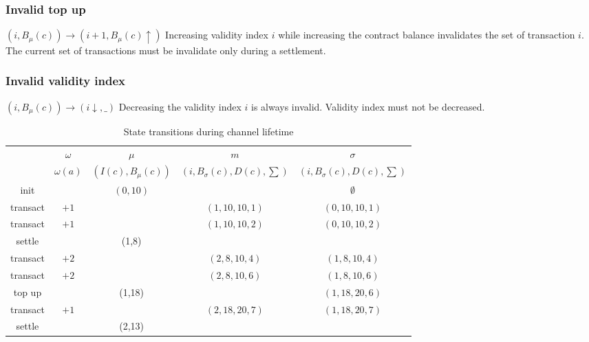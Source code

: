 \documentclass{llncs}
\begin{document}
\subsubsection{Invalid top up} $(i, B_\mu(c)) \rightarrow (i+1, B_\mu(c)\uparrow)$ Increasing validity index $i$ while increasing the contract balance invalidates the set of transaction $i$. The current set of transactions must be invalidate only during a settlement.

\subsubsection{Invalid validity index} $(i, B_\mu(c)) \rightarrow (i\downarrow, \_)$ Decreasing the validity index $i$ is always invalid. Validity index must not be decreased.

\begin{table}[t]
  \begin{tabularx}{\textwidth}{| S | S | C | C | C |}
       & $\omega$ & $\mu$ & $m$ & $\sigma$ \\ 
       & $\omega(a)$ & $(I(c), B_\mu(c))$ & $(i, B_\sigma(c), D(c), \sum)$ & $(i, B_\sigma(c), D(c), \sum)$ \\
  \hhline{-====}
      init & & $(0,10)$ & & $\emptyset$ \\
      transact & $+1$ & & $(1, 10, 10, 1)$& $(0, 10, 10, 1)$ \\
      transact & $+1$ & & $(1, 10, 10, 2)$& $(0, 10, 10, 2)$ \\
      settle & & (1,8) & & \\
      transact & $+2$  & & $(2, 8, 10, 4)$ & $(1, 8, 10, 4)$ \\
      transact & $+2$  & & $(2, 8, 10, 6)$ & $(1, 8, 10, 6)$ \\
      top up & & (1,18) & & $(1, 18, 20, 6)$ \\
      transact & $+1$ & & $(2, 18, 20, 7)$ & $(1, 18, 20, 7)$ \\
      settle & & (2,13) & & \\
  \end{tabularx}
  \medskip
  \caption{State transitions during channel lifetime}
\end{table}
\end{document}
